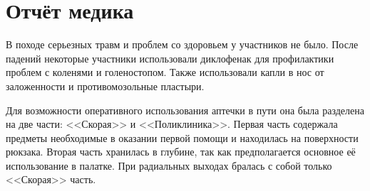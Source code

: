 \section{Отчёт медика}

	В походе серьезных травм и проблем со здоровьем у участников не было. После падений некоторые участники использовали диклофенак для профилактики проблем с коленями и голеностопом. Также использовали капли в нос от заложенности и противомозольные пластыри.

Для возможности оперативного использования аптечки в пути она была разделена на две части: <<Скорая>> и <<Поликлиника>>. Первая часть содержала предметы необходимые в оказании первой помощи и находилась на поверхности рюкзака. Вторая часть хранилась в глубине, так как предполагается основное её использование в палатке. При радиальных выходах бралась с собой только <<Скорая>> часть.

